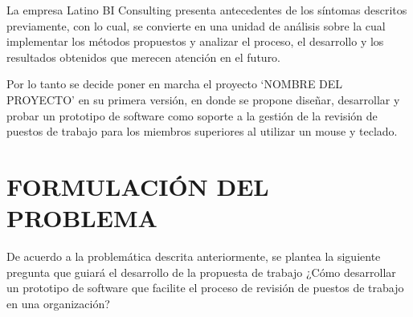 La empresa Latino BI Consulting presenta antecedentes de los síntomas descritos previamente, con lo cual, se convierte en una unidad de análisis sobre la cual implementar los métodos propuestos y analizar el proceso, el desarrollo y los resultados obtenidos que merecen atención en el futuro.

Por lo tanto se decide poner en marcha el proyecto ‘NOMBRE DEL PROYECTO’ en su primera versión, en donde se propone diseñar, desarrollar y probar un prototipo de software como soporte a la gestión de la revisión de puestos de trabajo para los miembros superiores al utilizar un mouse y teclado.

\section{FORMULACIÓN DEL PROBLEMA}
De acuerdo a la problemática descrita anteriormente, se plantea la siguiente pregunta que guiará el desarrollo de la propuesta de trabajo ¿Cómo desarrollar un prototipo de software que facilite el proceso de revisión de puestos de trabajo en una organización?